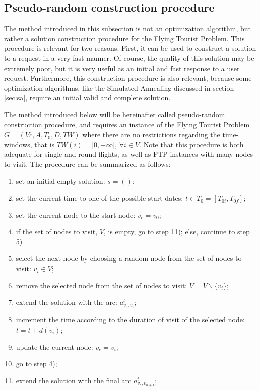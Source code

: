 \subsection{Pseudo-random construction procedure}
\label{sec:pseudo_random}

The method introduced in this subsection is not an optimization algorithm, but rather a solution construction procedure for the Flying Tourist Problem. This procedure is relevant for two reasons. First, it can be used to construct a solution to a request in a very fast manner. Of course, the quality of this solution may be extremely poor, but it is very useful as an initial and fast response to a user request. 
Furthermore, this construction procedure is also relevant, because some optimization algorithms, like the Simulated Annealing discussed in section \ref{sec:sa}, require an initial valid and complete solution.

The method introduced below will be hereinafter called pseudo-random construction procedure, and requires an instance of the Flying Tourist Problem $G=(Vc,A,T_0,D,TW)$ where there are no restrictions regarding the time-windows, that is $TW(i) = [0, +\infty[$, $\forall i \in V$. Note that this procedure is both adequate for single and round flights, as well as FTP instances with many nodes to visit. The procedure can be summarized as follows:

\begin{enumerate}
\itemsep0em 
    \item set an initial empty solution: $s=()$;
    \item set the current time to one of the possible start dates: $t \in T_0=[T_{0i}, T_{0f}]$;
    \item set the current node to the start node: $v_c = v_0$;
    \item if the set of nodes to visit, $V$, is empty, go to step 11); else, continue to step 5)
    \item select the next node by choosing a random node from the set of nodes to visit: $v_i \in V$;
    \item remove the selected node from the set of nodes to visit: $V=V\backslash\{v_i\}$;
    \item extend the solution with the arc: $a_{v_c, v_i}^t$;
    \item increment the time according to the duration of visit of the selected node: $t=t+d(v_i)$;
    \item update the current node: $v_c=v_i$;
    \item go to step 4);
    \item extend the solution with the final arc $a_{v_c, v_{n+1}}^t$;
\end{enumerate}